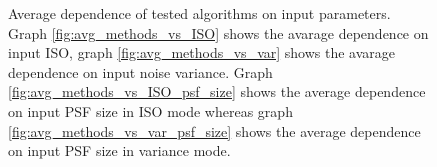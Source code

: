 \documentclass[12pt,notitlepage]{report}
\begin{document}
\begin{figure}[h]
  \caption[Average dependence of tested algorithms on input parameters]{Average dependence of tested algorithms on input parameters. Graph \ref{fig:avg_methods_vs_ISO} shows the avarage dependence on input ISO, graph \ref{fig:avg_methods_vs_var} shows the avarage dependence on input noise variance. Graph \ref{fig:avg_methods_vs_ISO_psf_size} shows the average dependence on input PSF size in ISO mode whereas graph \ref{fig:avg_methods_vs_var_psf_size} shows the average dependence on input PSF size in variance mode.}
  \label{fig:avg_methods}
\end{figure}





\end{document}
